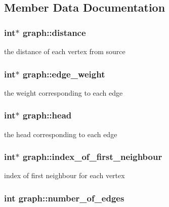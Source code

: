 \subsection{Member Data Documentation}
\hypertarget{structgraph_af714f1a4447ee2e62dae3ae536eb146a}{
\subsubsection[{distance}]{\setlength{\rightskip}{0pt plus 5cm}int$\ast$ graph\+::distance}}\label{structgraph_af714f1a4447ee2e62dae3ae536eb146a}
the distance of each vertex from source \hypertarget{structgraph_a2ddac6d6a82c058f61c563170da819eb}{
\subsubsection[{edge\+\_\+weight}]{\setlength{\rightskip}{0pt plus 5cm}int$\ast$ graph\+::edge\+\_\+weight}}\label{structgraph_a2ddac6d6a82c058f61c563170da819eb}
the weight corresponding to each edge \hypertarget{structgraph_af415beb685d5327be1711863fd16ac8c}{
\subsubsection[{head}]{\setlength{\rightskip}{0pt plus 5cm}int$\ast$ graph\+::head}}\label{structgraph_af415beb685d5327be1711863fd16ac8c}
the head corresponding to each edge \hypertarget{structgraph_a276924ecc3886fd1c3fdc42afbcf5352}{
\subsubsection[{index\+\_\+of\+\_\+first\+\_\+neighbour}]{\setlength{\rightskip}{0pt plus 5cm}int$\ast$ graph\+::index\+\_\+of\+\_\+first\+\_\+neighbour}}\label{structgraph_a276924ecc3886fd1c3fdc42afbcf5352}
index of first neighbour for each vertex \hypertarget{structgraph_a87abdc5f72cfd3d9b247978491fdbea5}{
\subsubsection[{number\+\_\+of\+\_\+edges}]{\setlength{\rightskip}{0pt plus 5cm}int graph\+::number\+\_\+of\+\_\+edges}}\label{structgraph_a87abdc5f72cfd3d9b247978491fdbea5}
